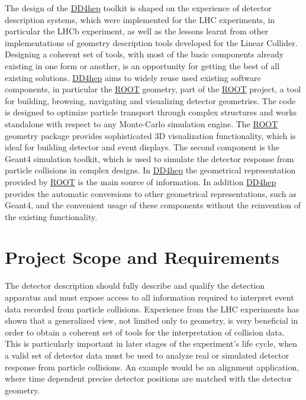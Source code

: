 The design of the \hyperlink{namespace_d_d4hep}{DD4hep} toolkit is shaped on the experience of detector description systems, which were implemented for the LHC experiments, in particular the LHCb experiment, as well as the lessons learnt from other implementations of geometry description tools developed for the Linear Collider. Designing a coherent set of tools, with most of the basic components already existing in one form or another, is an opportunity for getting the best of all existing solutions. \hyperlink{namespace_d_d4hep}{DD4hep} aims to widely reuse used existing software components, in particular the \hyperlink{namespace_r_o_o_t}{ROOT} geometry, part of the \hyperlink{namespace_r_o_o_t}{ROOT} project, a tool for building, browsing, navigating and visualizing detector geometries. The code is designed to optimize particle transport through complex structures and works standalone with respect to any Monte-\/Carlo simulation engine. The \hyperlink{namespace_r_o_o_t}{ROOT} geometry package provides sophisticated 3D visualization functionality, which is ideal for building detector and event displays. The second component is the Geant4 simulation toolkit, which is used to simulate the detector response from particle collisions in complex designs. In \hyperlink{namespace_d_d4hep}{DD4hep} the geometrical representation provided by \hyperlink{namespace_r_o_o_t}{ROOT} is the main source of information. In addition \hyperlink{namespace_d_d4hep}{DD4hep} provides the automatic conversions to other geometrical representations, such as Geant4, and the convenient usage of these components without the reinvention of the existing functionality.\hypertarget{index_SCOPE}{}\section{Project Scope and Requirements}\label{index_SCOPE}
The detector description should fully describe and qualify the detection apparatus and must expose access to all information required to interpret event data recorded from particle collisions. Experience from the LHC experiments has shown that a generalized view, not limited only to geometry, is very beneficial in order to obtain a coherent set of tools for the interpretation of collision data. This is particularly important in later stages of the experiment's life cycle, when a valid set of detector data must be used to analyze real or simulated detector response from particle collisions. An example would be an alignment application, where time dependent precise detector positions are matched with the detector geometry.

